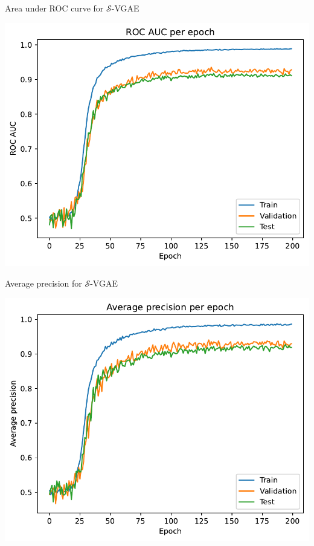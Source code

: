 \begin{frame}{Area under ROC curve for $\mathcal{S}$-VGAE}
  \begin{center}
    \includegraphics[width=.8\hsize]{figures/vMF_auc.pdf}
  \end{center}
\end{frame}

\begin{frame}{Average precision for $\mathcal{S}$-VGAE}
  \begin{center}
    \includegraphics[width=.8\hsize]{figures/vMF_ap.pdf}
  \end{center}
\end{frame}